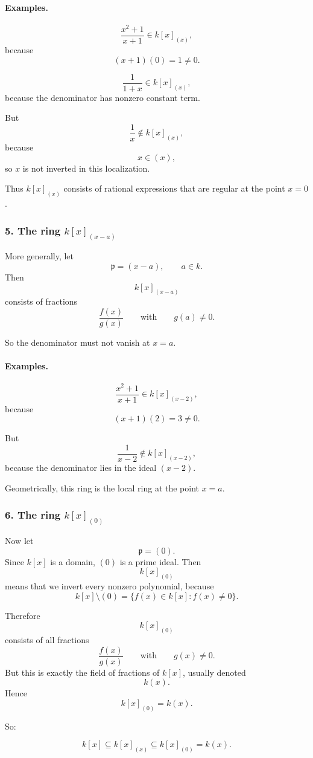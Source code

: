 \documentclass[12pt,a4paper]{article}
\theoremstyle{notespace}
\theoremstyle{definition}
\begin{document}
\paragraph{Examples.}
\[
\frac{x^2+1}{x+1}\in k[x]_{(x)},
\]
because
\[
(x+1)(0)=1\neq 0.
\]

\[
\frac{1}{1+x}\in k[x]_{(x)},
\]
because the denominator has nonzero constant term.

But
\[
\frac{1}{x}\notin k[x]_{(x)},
\]
because
\[
x\in (x),
\]
so \(x\) is not inverted in this localization.

Thus \(k[x]_{(x)}\) consists of rational expressions that are regular at the point \(x=0\).

\subsubsection{5. The ring \(k[x]_{(x-a)}\)}

More generally, let
\[
\mathfrak p=(x-a),
\qquad a\in k.
\]
Then
\[
k[x]_{(x-a)}
\]
consists of fractions
\[
\frac{f(x)}{g(x)}
\qquad\text{with}\qquad g(a)\neq 0.
\]

So the denominator must not vanish at \(x=a\).

\paragraph{Examples.}
\[
\frac{x^2+1}{x+1}\in k[x]_{(x-2)},
\]
because
\[
(x+1)(2)=3\neq 0.
\]

But
\[
\frac{1}{x-2}\notin k[x]_{(x-2)},
\]
because the denominator lies in the ideal \((x-2)\).

Geometrically, this ring is the local ring at the point \(x=a\).

\subsubsection{6. The ring \(k[x]_{(0)}\)}

Now let
\[
\mathfrak p=(0).
\]
Since \(k[x]\) is a domain, \((0)\) is a prime ideal. Then
\[
k[x]_{(0)}
\]
means that we invert every nonzero polynomial, because
\[
k[x]\setminus (0)=\{f(x)\in k[x]:f(x)\neq 0\}.
\]

Therefore
\[
k[x]_{(0)}
\]
consists of all fractions
\[
\frac{f(x)}{g(x)}
\qquad\text{with}\qquad g(x)\neq 0.
\]
But this is exactly the field of fractions of \(k[x]\), usually denoted
\[
k(x).
\]
Hence
\[
k[x]_{(0)}=k(x).
\]

So:

\[
k[x]
\subseteq
k[x]_{(x)}
\subseteq
k[x]_{(0)}=k(x).
\]
\end{document}
